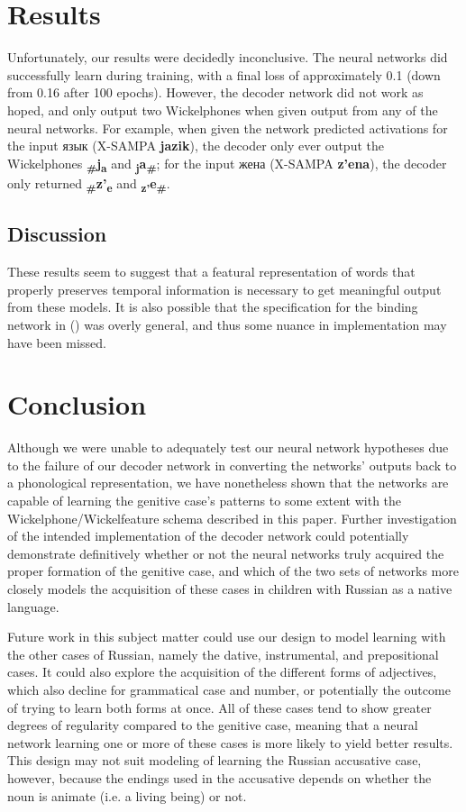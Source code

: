 \documentclass[11pt,a4paper]{article}
\newcommand{\citenp}[1]{\citeauthor{#1} (\citeyear{#1})}
\begin{document}
\section{Results}
Unfortunately, our results were decidedly inconclusive.
The neural networks did successfully learn during training,
with a final loss of approximately 0.1 (down from 0.16 after 100 epochs).
However, the decoder network did not work as hoped, and only output two Wickelphones
when given output from any of the neural networks. For example, when given the network predicted activations
for the input \foreignlanguage{russian}{язык} (X-SAMPA \textbf{jazik}), the decoder only ever output
the Wickelphones \textbf{\textsubscript{\#}j\textsubscript{a}} and \textbf{\textsubscript{j}a\textsubscript{\#}};
for the input \foreignlanguage{russian}{жена} (X-SAMPA \textbf{z'ena}), the decoder only returned \textbf{\textsubscript{\#}z'\textsubscript{e}} and \textbf{\textsubscript{z'}e\textsubscript{\#}}.


\subsection{Discussion}
These results seem to suggest that a featural representation of words that properly preserves temporal
information is necessary to get meaningful output from these models. It is also possible that the
specification for the binding network in \citenp{RMcC} was overly general, and thus some nuance in implementation
may have been missed.

\section{Conclusion}

Although we were unable to adequately test our neural network hypotheses due to the
failure of our decoder network in converting the networks' outputs back to a phonological
representation, we have nonetheless shown that the networks are capable of learning the
genitive case's patterns to some extent with the Wickelphone/Wickelfeature schema described
in this paper. Further investigation of the intended implementation of the decoder network
could potentially demonstrate definitively whether or not the neural networks truly acquired 
the proper formation of the genitive case, and which of the two sets of networks more closely
models the acquisition of these cases in children with Russian as a native language.

Future work in this subject matter could use our design to model learning with the other cases 
of Russian, namely the dative, instrumental, and prepositional cases. It could also explore the
acquisition of the different forms of adjectives, which also decline for grammatical case and
number, or potentially the outcome of trying to learn both forms at once. All of these cases
tend to show greater degrees of regularity compared to the genitive case, meaning that a neural network
learning one or more of these cases is more likely to yield better results. This design
may not suit modeling of learning the Russian accusative case, however, because the endings used in the accusative depends on whether the noun is animate (i.e. a living being) or not.

{}

\end{document}
